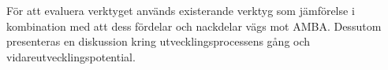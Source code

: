 För att evaluera verktyget används existerande verktyg som jämförelse i
kombination med att dess fördelar och nackdelar vägs mot AMBA. Dessutom
presenteras en diskussion kring utvecklingsprocessens gång och
vidareutvecklingspotential.
